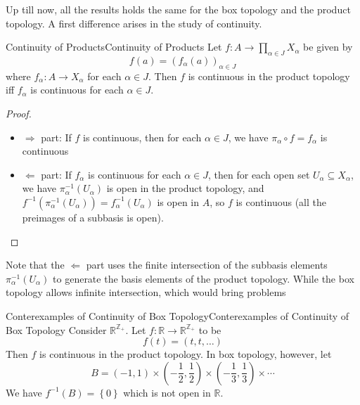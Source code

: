 \documentclass[../main.tex]{subfiles}
\begin{document}
Up till now, all the results holds the same for the box topology and the product topology. A first difference arises in the study of continuity.

\begin{theorem}{Continuity of Products}{Continuity of Products}
Let $f:A \rightarrow \prod _{\alpha\in J} X_{\alpha}$ be given by
\begin{equation*}
	f(a) = (f_{\alpha}(a))_{\alpha\in J}
\end{equation*}
where $f_{\alpha}: A \rightarrow X_{\alpha}$ for each $\alpha\in J$. Then $f$ is continuous in the product topology iff $f_{\alpha}$ is continuous for each $\alpha\in J$.
\end{theorem}
\begin{proof}
\begin{itemize}
\item $\Rightarrow$ part: If $f$ is continuous, then for each $\alpha\in J$, we have $\pi_{\alpha}\circ f = f_{\alpha}$ is continuous
\item $\Leftarrow$ part: If $f_{\alpha}$ is continuous for each $\alpha\in J$, then for each open set $U_{\alpha} \subseteq X_{\alpha}$, we have $\pi_{\alpha}^{-1}(U_{\alpha})$ is open in the product topology, and $f^{-1}(\pi_{\alpha}^{-1}(U_{\alpha})) = f_{\alpha}^{-1}(U_{\alpha})$ is open in $A$, so $f$ is continuous (all the preimages of a subbasis is open).
\end{itemize}
\end{proof}

Note that the $\Leftarrow$ part uses the finite intersection of the subbasis elements $\pi_{\alpha}^{-1}(U_{\alpha})$ to generate the basis elements of the product topology. While the box topology allows infinite intersection, which would bring problems

\begin{example}{Conterexamples of Continuity of Box Topology}{Conterexamples of Continuity of Box Topology}
Consider $\mathbb{R}^{\mathbb{Z}_+}$. Let $f: \mathbb{R}\rightarrow \mathbb{R}^{\mathbb{Z}_+}$ to be
\begin{equation*}
f(t) = (t,t, \ldots )
\end{equation*}
Then $f$ is continuous in the product topology. In box topology, however, let
\begin{equation*}
	 B = (-1,1) \times (-\frac{1}{2}, \frac{1}{2}) \times (-\frac{1}{3}, \frac{1}{3}) \times \cdots
\end{equation*}
We have $f^{-1}(B) = \left\{ 0 \right\}$ which is not open in $\mathbb{R}$.
\end{example}
\end{document}
